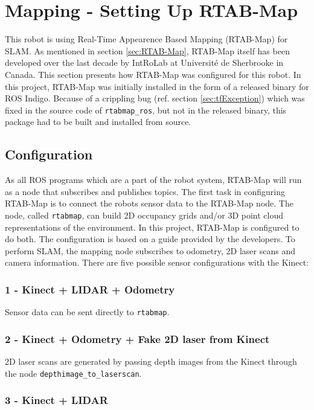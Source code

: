 \section{Mapping - Setting Up RTAB-Map}
\label{sec:mapping}
This robot is using Real-Time Appearence Based Mapping (\ac{RTAB-Map}) for \ac{SLAM}. As mentioned in section \ref{sec:RTAB-Map}, \ac{RTAB-Map} itself has been developed over the last decade by IntRoLab at Université de Sherbrooke in Canada. This section presents how \ac{RTAB-Map} was configured for this robot. In this project, \ac{RTAB-Map} was initially installed in the form of a released binary for \ac{ROS} Indigo. Because of a crippling bug (ref. section \ref{sec:tfException}) which was fixed in the source code
of \texttt{rtabmap\_ros}, but not in the released binary, this package had to be built and installed from source.

\subsection{Configuration}
\label{sec:configuration}
As all \ac{ROS} programs which are a part of the robot system, \ac{RTAB-Map} will run as a node that subscribes and publishes topics. The first task in configuring \ac{RTAB-Map} is to connect the robots sensor data to the \ac{RTAB-Map} node. The node, called \texttt{rtabmap}, can build 2D occupancy grids and/or 3D point cloud representations of the environment. In this project, \ac{RTAB-Map} is configured to do both. The configuration is based on a guide\cite{rtabmap_setup} provided by the developers. To perform \ac{SLAM}, the mapping node subscribes to odometry, 2D laser scans and camera information. There are five possible sensor configurations with the Kinect\cite{rtabmap_setup}:

\subsubsection{1 - Kinect + LIDAR + Odometry} 
Sensor data can be sent directly to \texttt{rtabmap}.

\subsubsection{2 - Kinect + Odometry + Fake 2D laser from Kinect}

2D laser scans are generated by passing depth images from the Kinect through the node \texttt{depthimage\_to\_laserscan}.

\subsubsection{3 - Kinect + LIDAR}

